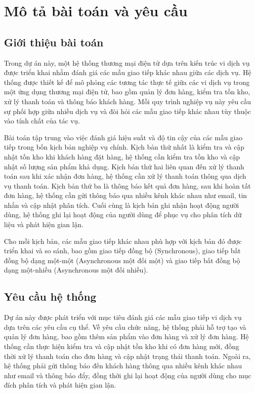 \section{Mô tả bài toán và yêu cầu}

\subsection{Giới thiệu bài toán}
Trong dự án này, một hệ thống thương mại điện tử dựa trên kiến trúc vi dịch vụ được triển khai nhằm đánh giá các mẫu giao tiếp khác nhau giữa các dịch vụ. Hệ thống được thiết kế để mô phỏng các tương tác thực tế giữa các vi dịch vụ trong một ứng dụng thương mại điện tử, bao gồm quản lý đơn hàng, kiểm tra tồn kho, xử lý thanh toán và thông báo khách hàng. Mỗi quy trình nghiệp vụ này yêu cầu sự phối hợp giữa nhiều dịch vụ và đòi hỏi các mẫu giao tiếp khác nhau tùy thuộc vào tính chất của tác vụ.

Bài toán tập trung vào việc đánh giá hiệu suất và độ tin cậy của các mẫu giao tiếp trong bốn kịch bản nghiệp vụ chính. Kịch bản thứ nhất là kiểm tra và cập nhật tồn kho khi khách hàng đặt hàng, hệ thống cần kiểm tra tồn kho và cập nhật số lượng sản phẩm khả dụng. Kịch bản thứ hai liên quan đến xử lý thanh toán sau khi xác nhận đơn hàng, hệ thống cần xử lý thanh toán thông qua dịch vụ thanh toán. Kịch bản thứ ba là thông báo kết quả đơn hàng, sau khi hoàn tất đơn hàng, hệ thống cần gửi thông báo qua nhiều kênh khác nhau như email, tin nhắn và cập nhật phân tích. Cuối cùng là kịch bản ghi nhận hoạt động người dùng, hệ thống ghi lại hoạt động của người dùng để phục vụ cho phân tích dữ liệu và phát hiện gian lận.

Cho mỗi kịch bản, các mẫu giao tiếp khác nhau phù hợp với kịch bản đó được triển khai và so sánh, bao gồm giao tiếp đồng bộ (Synchronous), giao tiếp bất đồng bộ dạng một-một (Asynchronous một đối một) và giao tiếp bất đồng bộ dạng một-nhiều (Asynchronous một đối nhiều).

\subsection{Yêu cầu hệ thống}
Dự án này được phát triển với mục tiêu đánh giá các mẫu giao tiếp vi dịch vụ dựa trên các yêu cầu cụ thể. Về yêu cầu chức năng, hệ thống phải hỗ trợ tạo và quản lý đơn hàng, bao gồm thêm sản phẩm vào đơn hàng và xử lý đơn hàng. Hệ thống cần thực hiện kiểm tra và cập nhật tồn kho khi có đơn hàng mới, đồng thời xử lý thanh toán cho đơn hàng và cập nhật trạng thái thanh toán. Ngoài ra, hệ thống phải gửi thông báo đến khách hàng thông qua nhiều kênh khác nhau như email và thông báo đẩy, đồng thời ghi lại hoạt động của người dùng cho mục đích phân tích và phát hiện gian lận.

